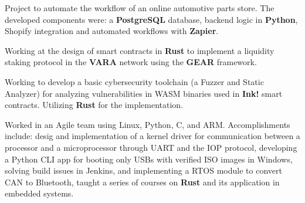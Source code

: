 


\sepspace



\sepspace
{}


{Project to automate the workflow of an online automotive parts store. The developed
components were: a \textbf{PostgreSQL} database, backend logic in
\textbf{Python}, Shopify integration and automated workflows with \textbf{Zapier}.}

{Working at the design of smart contracts in \textbf{Rust} to implement a
liquidity staking protocol in the \textbf{VARA} network using the \textbf{GEAR} framework. }

{Working to develop a basic cybersecurity toolchain (a Fuzzer and Static
Analyzer) for analyzing vulnerabilities in WASM binaries used in \textbf{Ink!}
smart contracts. Utilizing \textbf{Rust} for the implementation.}

{Worked in an Agile team using Linux, Python, C, and ARM.
  Accomplishments include: desig and implementation of a kernel driver
  for communication between a processor and a microprocessor through UART and the IOP protocol,
  developing a Python CLI app for booting only USBs with verified ISO images in Windows,
  solving build issues in Jenkins,
  and implementing a RTOS module to convert CAN to Bluetooth,
  taught a series of courses on \textbf{Rust} and its application in embedded systems. }

